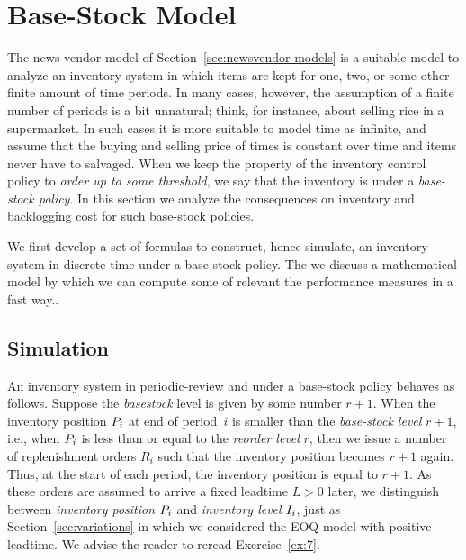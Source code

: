 \section{Base-Stock Model}
\label{sec:base-stock-model}



The news-vendor model of Section~\ref{sec:newsvendor-models} is a suitable model to analyze an inventory system in which items are kept for one, two, or some other finite amount of time periods. In many cases, however, the assumption of a finite number of periods is a bit unnatural; think, for instance, about selling rice in a supermarket. In such cases it is more suitable to model time as infinite, and assume that the buying and selling price of times is constant over time and items never have to salvaged. When we keep the property of the inventory control policy to \emph{order up to some threshold}, we say that the inventory is under a \emph{base-stock policy}. In this section we analyze the consequences on inventory and backlogging cost for such base-stock policies. 

We first develop a set of formulas to construct, hence simulate, an inventory system in  discrete time under a  base-stock policy. The we discuss a mathematical model by which we can compute some of relevant the performance measures in a fast way..

\begin{comment}
We need to discuss the point of fixed or dynamic order quantities, and fixed versus dynamic order times in the intro of the basestock model. Like this we can position all the models. 

\begin{itemize}
\item $(T,Q)$ policy (silly policy both time and size are fixed)
\item $(T,S)$ policy (could be good fixed time variable size)
\item $(s,S)$ policy (best there is but you do not know in advance neither the time or the size. It is kind of ``nervous''.)
\end{itemize}
\end{comment}


\subsection{Simulation}

An inventory system in periodic-review and under a base-stock policy behaves as follows. Suppose the \emph{basestock} level is given by some number $r+1$. When the inventory position $P_i$ at end of period~$i$ is smaller than the \emph{base-stock level} $r+1$, i.e.,  when $P_i$ is less than or equal to the \emph{reorder level} $r$, then we issue a number of replenishment orders $R_i$ such that the inventory position becomes $r+1$ again. Thus, at the start of each period, the inventory position is equal to $r+1$. As these orders are assumed to arrive a fixed leadtime $L>0$ later, we distinguish between \emph{inventory position}  $P_i$ and \emph{inventory level} $I_i$, just as  Section~\ref{sec:variations} in which we considered the EOQ model with positive leadtime. We advise the reader to reread Exercise~\ref{ex:7}.

